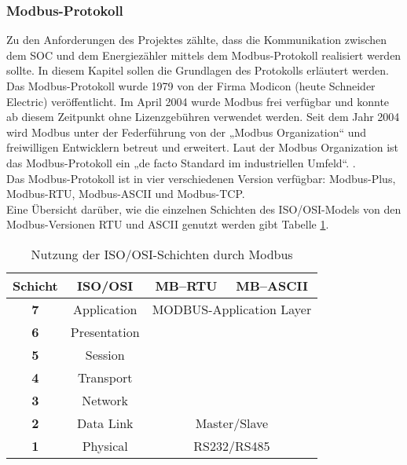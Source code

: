 \documentclass[../Bachelorarbeit.tex]{subfiles}
\begin{document}
\subsubsection*{Modbus-Protokoll}
\label{subsubsec:modbus} 
Zu den Anforderungen des Projektes zählte, dass die Kommunikation zwischen dem \ac{SOC} und dem Energiezähler mittels dem Modbus-Protokoll realisiert werden sollte. In diesem Kapitel sollen die Grundlagen des Protokolls erläutert werden.\\
Das Modbus-Protokoll wurde 1979 von der Firma Modicon (heute Schneider Electric) 
veröffentlicht. Im April 2004 wurde Modbus frei verfügbar und konnte ab diesem Zeitpunkt ohne Lizenzgebühren verwendet werden. Seit dem Jahr 2004 wird Modbus unter der Federführung von der „Modbus Organization“ und freiwilligen Entwicklern betreut und erweitert. Laut der Modbus Organization ist das Modbus-Protokoll ein „de facto Standard im industriellen Umfeld“. 
\parencite[vgl.][]{modbus_faq}. \\
Das Modbus-Protokoll ist in vier verschiedenen Version verfügbar: Modbus-Plus, Modbus-\ac{RTU}, Modbus-\ac{ASCII} und Modbus-\ac{TCP}. \\
Eine Übersicht darüber, wie die einzelnen Schichten des \acs{ISO}/\acs{OSI}-Models von den Modbus-Versionen RTU und ASCII genutzt werden gibt Tabelle \ref{tab:iso/osi_modbus}.\\

\begin{table}
\begin{tabular}{|c|c|c|c|}
\hline 
\rule[0ex]{0pt}{2.5ex} \textbf{Schicht} & \textbf{\acs{ISO}/\acs{OSI}} & \textbf{MB–RTU} & \textbf{MB–ASCII} \\ 
\hline 
\rule[-0ex]{0pt}{2.5ex} \textbf{7} & Application & \multicolumn{2}{c|}{MODBUS-Application Layer} \\ 
\hline 
\rule[-0ex]{0pt}{2.5ex} \textbf{6} & Presentation &  &  \\ 
\hline 
\rule[-0ex]{0pt}{2.5ex} \textbf{5} & Session &  &  \\ 
\hline 
\rule[-0ex]{0pt}{2.5ex} \textbf{4} & Transport &  &  \\ 
\hline 
\rule[-0ex]{0pt}{2.5ex} \textbf{3} & Network & &  \\ 
\hline 
\rule[-0ex]{0pt}{2.5ex} \textbf{2} & Data Link & \multicolumn{2}{c|}{Master/Slave} \\ 
\hline 
\rule[-0ex]{0pt}{2.5ex} \textbf{1} & Physical & \multicolumn{2}{c|}{RS232/RS485} \\ 
\hline 
\end{tabular} 
\caption{Nutzung der ISO/OSI-Schichten durch Modbus\parencite[vgl.][S. 310 - Tabelle wurde durch Verfasser angepasst]{bussyteme}}
\label{tab:iso/osi_modbus}
\end{table}
\end{document}
